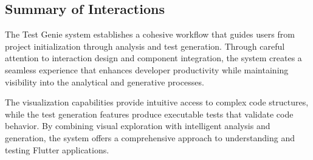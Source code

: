 \subsection{Summary of Interactions}

The Test Genie system establishes a cohesive workflow that guides users from project initialization through analysis and test generation. Through careful attention to interaction design and component integration, the system creates a seamless experience that enhances developer productivity while maintaining visibility into the analytical and generative processes.

The visualization capabilities provide intuitive access to complex code structures, while the test generation features produce executable tests that validate code behavior. By combining visual exploration with intelligent analysis and generation, the system offers a comprehensive approach to understanding and testing Flutter applications.